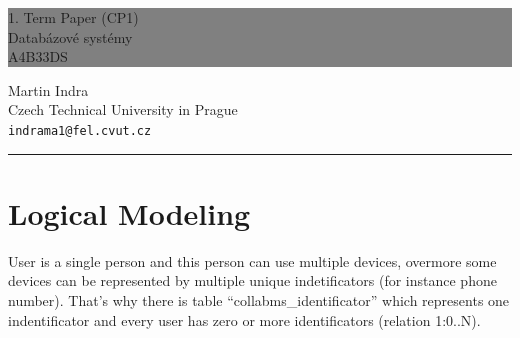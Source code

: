 \documentclass[12pt,oneside,a4paper]{article}
\newcommand{\HRule}[1]{\hfill \rule{0.2\linewidth}{#1}} %
\begin{document}
\thispagestyle{empty} %


\colorbox{grey}{
	\parbox[t]{1.0\linewidth}{
		\centering \fontsize{30pt}{50pt}\selectfont %
		\vspace*{0.7cm} %
		
		\hfill 1. Term Paper (CP1) \\
		\hfill Databázové systémy \\
		\hfill A4B33DS\par
		
		\vspace*{0.7cm} %
	}
}


\vfill %


{\centering \large 
\hfill Martin Indra \\
\hfill Czech Technical University in Prague \\
\hfill \texttt{indrama1@fel.cvut.cz} \\

\HRule{1pt}} %


\clearpage %
\newpage

\section{Logical Modeling}

User is a single person and this person can use multiple devices, overmore some devices can be represented by multiple unique indetificators (for instance phone number). That's why there is table ``collabms\_{}identificator'' which represents one indentificator and every user has zero or more identificators (relation 1:0..N).
\end{document}

